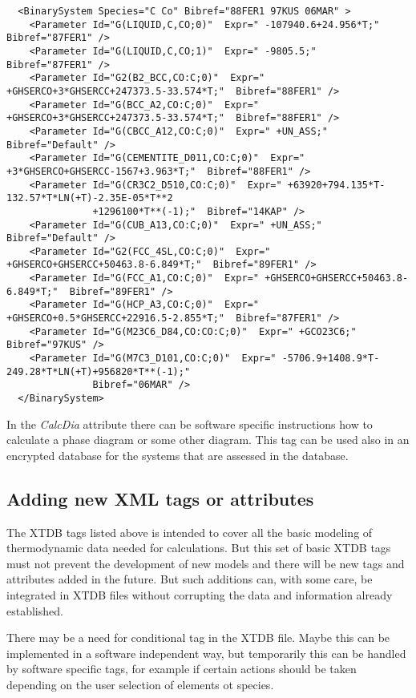 \documentclass{article}
\begin{document}
{\begin{verbatim}
  <BinarySystem Species="C Co" Bibref="88FER1 97KUS 06MAR" >
    <Parameter Id="G(LIQUID,C,CO;0)"  Expr=" -107940.6+24.956*T;"  Bibref="87FER1" />
    <Parameter Id="G(LIQUID,C,CO;1)"  Expr=" -9805.5;"  Bibref="87FER1" />
    <Parameter Id="G2(B2_BCC,CO:C;0)"  Expr=" +GHSERCO+3*GHSERCC+247373.5-33.574*T;"  Bibref="88FER1" />
    <Parameter Id="G(BCC_A2,CO:C;0)"  Expr=" +GHSERCO+3*GHSERCC+247373.5-33.574*T;"  Bibref="88FER1" />
    <Parameter Id="G(CBCC_A12,CO:C;0)"  Expr=" +UN_ASS;"  Bibref="Default" />
    <Parameter Id="G(CEMENTITE_D011,CO:C;0)"  Expr=" +3*GHSERCO+GHSERCC-1567+3.963*T;"  Bibref="88FER1" />
    <Parameter Id="G(CR3C2_D510,CO:C;0)"  Expr=" +63920+794.135*T-132.57*T*LN(+T)-2.35E-05*T**2
               +1296100*T**(-1);"  Bibref="14KAP" />
    <Parameter Id="G(CUB_A13,CO:C;0)"  Expr=" +UN_ASS;"  Bibref="Default" />
    <Parameter Id="G2(FCC_4SL,CO:C;0)"  Expr=" +GHSERCO+GHSERCC+50463.8-6.849*T;"  Bibref="89FER1" />
    <Parameter Id="G(FCC_A1,CO:C;0)"  Expr=" +GHSERCO+GHSERCC+50463.8-6.849*T;"  Bibref="89FER1" />
    <Parameter Id="G(HCP_A3,CO:C;0)"  Expr=" +GHSERCO+0.5*GHSERCC+22916.5-2.855*T;"  Bibref="87FER1" />
    <Parameter Id="G(M23C6_D84,CO:CO:C;0)"  Expr=" +GCO23C6;"  Bibref="97KUS" />
    <Parameter Id="G(M7C3_D101,CO:C;0)"  Expr=" -5706.9+1408.9*T-249.28*T*LN(+T)+956820*T**(-1);"
               Bibref="06MAR" />
  </BinarySystem>
\end{verbatim}
}

In the {\em CalcDia} attribute there can be software specific
instructions how to calculate a phase diagram or some other diagram.
This tag can be used also in an encrypted database for the systems
that are assessed in the database.

\subsection{Adding new XML tags or attributes}

The XTDB tags listed above is intended to cover all the basic modeling
of thermodynamic data needed for calculations.  But this set of basic
XTDB tags must not prevent the development of new models and there
will be new tags and attributes added in the future.  But such
additions can, with some care, be integrated in XTDB files without
corrupting the data and information already established.

There may be a need for conditional tag in the XTDB file.  Maybe this
can be implemented in a software independent way, but temporarily this
can be handled by software specific tags, for example if certain
actions should be taken depending on the user selection of elements ot
species.
\end{document}
